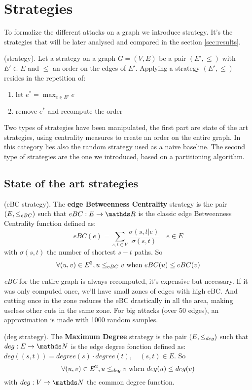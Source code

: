 \section{Strategies}
\label{sec:strategies}
To formalize the different attacks on a graph we introduce strategy. It's the strategies that will be later analysed and compared in the section \ref*{sec:results}.
\begin{definition}(strategy).
    Let a strategy on a graph $G = (V, E)$ be a pair $(E', \leq)$ with $E'\subset E$ and $\leq$ an order on the edges of $E'$. Applying a strategy $(E', \leq)$ resides in the repetition of:
    \begin{enumerate}
        \item let $e^* = \max_{e\in E'}{e}$
        \item remove $e^*$ and recompute the order
    \end{enumerate}
\end{definition}

Two types of strategies have been manipulated, the first part are state of the art strategies, using centrality measures to create an order on the entire graph. In this category lies also the random strategy used as a naive baseline. The second type of strategies are the one we introduced, based on a partitioning algorithm.
\subsection*{State of the art strategies}
\begin{definition}(eBC strategy).
    The \textbf{edge Betweenness Centrality} strategy is the pair $(E, \leq_{eBC})$ such that $eBC: E \to \R$ is the classic edge Betweenness Centrality function defined as:
    $$eBC(e) = \sum_{s, t \in V}\frac{\sigma(s, t | e)}{\sigma(s, t)} \quad e\in E$$
    with $\sigma(s, t)$ the number of shortest $s-t$ paths. So $$\forall (u, v) \in E^2, u \leq_{eBC} v \text{ when } eBC(u) \leq eBC(v)$$
\end{definition}
\textit{eBC} for the entire graph is always recomputed, it's expensive but necessary. If it was only computed once, we'll have small zones of edges with high eBC. And cutting once in the zone reduces the eBC drastically in all the area, making useless other cuts in the same zone. For big attacks (over 50 edges), an approximation is made with 1000 random samples.

\begin{definition}(deg strategy).
    The \textbf{Maximum Degree} strategy is the pair $(E, \leq_{deg})$ such that $deg: E \to \N$ is the edge degree fonction defined as: $deg((s, t)) = degree(s) \cdot degree(t),\quad (s, t)\in E$. So
    $$\forall (u, v) \in E^2, u \leq_{deg} v \text{ when } deg(u) \leq deg(v)$$
    with $deg: V \to \N$ the common degree function.
\end{definition}

